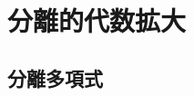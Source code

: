 \documentclass[../master_galois_theory]{subfiles}
\begin{document}
\setcounter{section}{8}

\section{分離的代数拡大}

\subsection{分離多項式}
\end{document}
